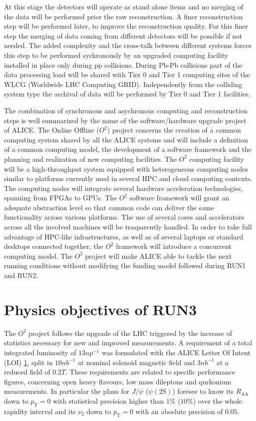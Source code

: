 At this stage the detectors will operate as stand alone items and no merging of the data will be performed prior the raw reconstruction.
A finer reconstruction step will be performed later, to improve the reconstruction quality.
For this finer step the merging of data coming from different detectors will be possible if not needed.
The added complexity and the cross-talk between different systems forces this step to be performed sychronously by an upgraded computing facility installed in place only during pp collisions.
During Pb-Pb collisions part of the data processing load will be shared with Tier 0 and Tier 1 computing sites of the WLCG (Worldwide LHC Computing GRID).
Independently from the colliding system type the archival of data will be performed by Tier 0 and Tier 1 facilities.

The combination of synchronous and asychronous computing and reconstruction steps is well summarized by the name of the software/hardware upgrade project of ALICE.
The Online Offline ($O^2$) project concerns the creation of a common computing system shared by all the ALICE systems and will include a definition of a common computing model, the development of a software framework and the planning and realization of new computing facilities.
The $O^2$ computing facility will be a high-throughput system equipped with heterogeneous computing nodes similar to platforms currently used in several HPC and cloud computing contexts.
The computing nodes will integrate several hardware acceleration technologies, spanning from FPGAs to GPUs.
The $O^2$ software framework will grant an adequate abstraction level so that common code can deliver the same functionality across various platforms.
The use of several cores and accelerators across all the involved machines will be trasparently handled.
In order to take full advantage of HPC-like infrastructures, as well as of several laptops or standard desktops connected together, the $O^2$ framework will introduce a concurrent computing model.
The $O^2$ project will make ALICE able to tackle the next running conditions without modifying the funding model followed during RUN1 and RUN2.

\section{Physics objectives of RUN3}
The $O^2$ project follows the upgrade of the LHC triggered by the increase of statistics necessary for new and improved measurements.
A requirement of a total integrated luminosity of $13 np^{-1}$ was formulated with the ALICE Letter Of Intent (LOI) \ref{}, split in $10 nb^{-1}$ at nominal solenoid magnetic field and $3 nb^{-1}$ at a reduced field of $0.2T$.
These requirements are related to specific performance figures, concerning open heavy flavours, low mass dileptons and qurkonium measurements.
In particular the plans for $J/\psi$ ($\psi(\mathrm{2S})$) foresee to know its $R_{\mathrm{AA}}$ down to $p_{\mathrm{T}} = 0$ with statistical precision higher than $1\%$ ($10\%$) over the whole rapidity interval and its $\nu_2$ down to $p_{\mathrm{T}} = 0$ with an aboslute precision of $0.05$.

